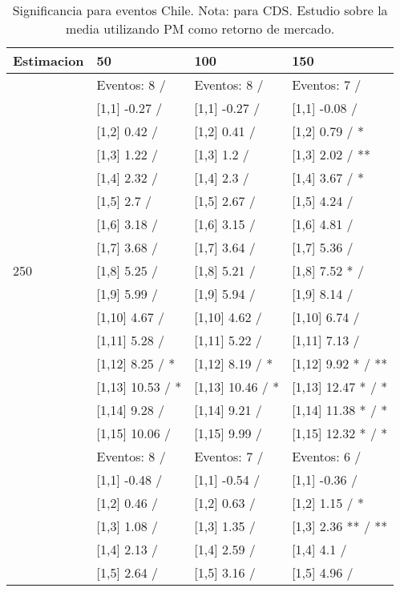 \begin{table}

\caption{Significancia para eventos Chile. Nota: para CDS. Estudio sobre la media utilizando PM como retorno de mercado.}
\centering
\begin{tabular}[t]{llll}
\toprule
Estimacion & 50 & 100 & 150\\
\midrule
 & Eventos:  8 / & Eventos:  8 / & Eventos:  7 /\\
 & {}[1,1] -0.27  / & {}[1,1] -0.27  / & {}[1,1] -0.08  /\\
 & {}[1,2] 0.42  / & {}[1,2] 0.41  / & {}[1,2] 0.79  / *\\
 & {}[1,3] 1.22  / & {}[1,3] 1.2  / & {}[1,3] 2.02  / **\\
 & {}[1,4] 2.32  / & {}[1,4] 2.3  / & {}[1,4] 3.67  / *\\
\addlinespace
 & {}[1,5] 2.7  / & {}[1,5] 2.67  / & {}[1,5] 4.24  /\\
 & {}[1,6] 3.18  / & {}[1,6] 3.15  / & {}[1,6] 4.81  /\\
 & {}[1,7] 3.68  / & {}[1,7] 3.64  / & {}[1,7] 5.36  /\\
250 & {}[1,8] 5.25  / & {}[1,8] 5.21  / & {}[1,8] 7.52 * /\\
 & {}[1,9] 5.99  / & {}[1,9] 5.94  / & {}[1,9] 8.14  /\\
\addlinespace
 & {}[1,10] 4.67  / & {}[1,10] 4.62  / & {}[1,10] 6.74  /\\
 & {}[1,11] 5.28  / & {}[1,11] 5.22  / & {}[1,11] 7.13  /\\
 & {}[1,12] 8.25  / * & {}[1,12] 8.19  / * & {}[1,12] 9.92 * / **\\
 & {}[1,13] 10.53  / * & {}[1,13] 10.46  / * & {}[1,13] 12.47 * / *\\
 & {}[1,14] 9.28  / & {}[1,14] 9.21  / & {}[1,14] 11.38 * / *\\
\addlinespace
 & {}[1,15] 10.06  / & {}[1,15] 9.99  / & {}[1,15] 12.32 * / *\\
 & Eventos:  8 / & Eventos:  7 / & Eventos:  6 /\\
 & {}[1,1] -0.48  / & {}[1,1] -0.54  / & {}[1,1] -0.36  /\\
 & {}[1,2] 0.46  / & {}[1,2] 0.63  / & {}[1,2] 1.15  / *\\
 & {}[1,3] 1.08  / & {}[1,3] 1.35  / & {}[1,3] 2.36 ** / **\\
\addlinespace
 & {}[1,4] 2.13  / & {}[1,4] 2.59  / & {}[1,4] 4.1  /\\
 & {}[1,5] 2.64  / & {}[1,5] 3.16  / & {}[1,5] 4.96  /\\

\end{tabular}
\end{table}
